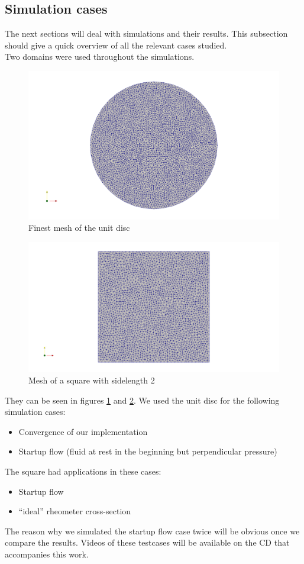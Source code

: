 \documentclass[12pt,a4paper,twoside, open=right]{scrreprt}
\theoremstyle{definition}
\theoremstyle{plain}
\begin{document}
\subsection{Simulation cases}
The next sections will deal with simulations and their results. This subsection should give a quick overview of all the relevant cases studied. \\
Two domains were used throughout the simulations. 
\begin{figure}
    \includegraphics[width=\textwidth]{meshcircle}
    \caption{Finest mesh of the unit disc}
    \label{fig:mesh}
\end{figure}
\begin{figure}
    \includegraphics[width=\textwidth]{meshsquare}
    \caption{Mesh of a square with sidelength 2}
    \label{fig:meshsquare}
\end{figure}
They can be seen in figures \ref{fig:mesh} and \ref{fig:meshsquare}.
We used the unit disc for the following simulation cases:
\begin{itemize}
    \item Convergence of our implementation
    \item Startup flow (fluid at rest in the beginning but perpendicular pressure)
\end{itemize}
The square had applications in these cases:
\begin{itemize}
    \item Startup flow
    \item \enquote{ideal} rheometer cross-section
\end{itemize}
The reason why we simulated the startup flow case twice will be obvious once we compare the results. Videos of these testcases will be available on the CD that accompanies this work.
\end{document}
